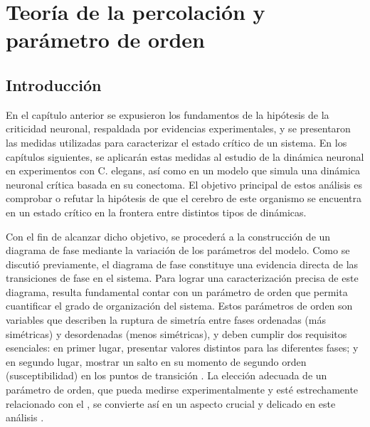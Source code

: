 \chapter{Teoría de la percolación y parámetro de orden}\label{titulo-cap-percolacion}
\graphicspath{{figs/capitulo_percolacion/}}



\section{Introducción}

En el capítulo anterior se expusieron los fundamentos de la hipótesis de la criticidad neuronal, respaldada por evidencias experimentales, y se presentaron las medidas utilizadas para caracterizar el estado crítico de un sistema. En los capítulos siguientes, se aplicarán estas medidas al estudio de la dinámica neuronal en experimentos con  C. elegans, así como en un modelo que simula una dinámica neuronal crítica basada en su conectoma. El objetivo principal de estos análisis es comprobar o refutar la hipótesis de que el cerebro de este organismo se encuentra en un estado crítico en la frontera entre distintos tipos de dinámicas.

Con el fin de alcanzar dicho objetivo, se procederá a la construcción de un diagrama de fase mediante la variación de los parámetros del modelo.  Como se discutió previamente, el diagrama de fase constituye una evidencia directa de las transiciones de fase en el sistema. Para lograr una caracterización precisa de este diagrama, resulta fundamental contar con un parámetro de orden que permita cuantificar el grado de organización del sistema. Estos parámetros de orden son variables que describen la ruptura de simetría entre fases ordenadas (más simétricas) y desordenadas  (menos simétricas), y deben cumplir dos requisitos esenciales: en primer lugar, presentar valores distintos para las diferentes fases; y en segundo lugar, mostrar un salto en su momento de segundo orden (susceptibilidad) en los puntos de transición  \cite{yin_neural_2021}. La elección adecuada de un parámetro de orden, que pueda medirse experimentalmente y esté estrechamente relacionado con el , se convierte así en un aspecto crucial y delicado en este análisis \cite{kleman_order_2003}.




